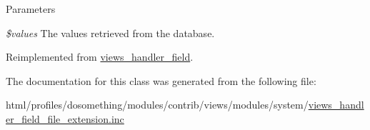 \begin{DoxyParams}{Parameters}
\item[{\em \$values}]The values retrieved from the database. \end{DoxyParams}


Reimplemented from \hyperlink{classviews__handler__field_a82ff951c5e9ceb97b2eab86f880cbc1e}{views\_\-handler\_\-field}.

The documentation for this class was generated from the following file:\begin{DoxyCompactItemize}
\item 
html/profiles/dosomething/modules/contrib/views/modules/system/\hyperlink{views__handler__field__file__extension_8inc}{views\_\-handler\_\-field\_\-file\_\-extension.inc}\end{DoxyCompactItemize}

